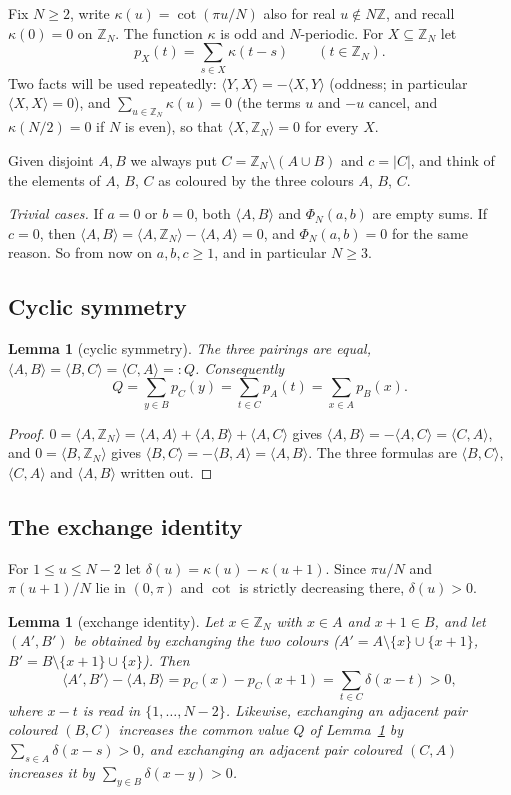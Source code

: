 \documentclass[11pt]{amsart}
\newtheorem{lemma}[theorem]{Lemma}
\theoremstyle{definition}
\theoremstyle{remark}
\newcommand{\Z}{\mathbb{Z}}
\newcommand{\ip}[2]{\langle #1,#2\rangle}
\begin{document}
Fix $N\ge2$, write $\kappa(u)=\cot(\pi u/N)$ also for real $u\notin N\Z$, and recall $\kappa(0)=0$ on $\Z_N$. The
function $\kappa$ is odd and $N$-periodic. For $X\subseteq\Z_N$ let
\[
p_X(t)=\sum_{s\in X}\kappa(t-s)\qquad(t\in\Z_N).
\]
Two facts will be used repeatedly: $\ip YX=-\ip XY$ (oddness; in particular $\ip XX=0$), and
$\sum_{u\in\Z_N}\kappa(u)=0$ (the terms $u$ and $-u$ cancel, and $\kappa(N/2)=0$ if $N$ is even), so that
$\ip X{\Z_N}=0$ for every $X$.

Given disjoint $A,B$ we always put $C=\Z_N\setminus(A\cup B)$ and $c=|C|$, and think of the elements of $A$, $B$,
$C$ as coloured by the three colours $A$, $B$, $C$.

\emph{Trivial cases.} If $a=0$ or $b=0$, both $\ip AB$ and $\Phi_N(a,b)$ are empty sums. If $c=0$, then
$\ip AB=\ip A{\Z_N}-\ip AA=0$, and $\Phi_N(a,b)=0$ for the same reason. So from now on $a,b,c\ge1$, and in
particular $N\ge3$.

\subsection{Cyclic symmetry}

\begin{lemma}[cyclic symmetry]\label{lem:cyclic}
The three pairings are equal, $\ip AB=\ip BC=\ip CA=:Q$. Consequently
\[
Q=\sum_{y\in B}p_C(y)=\sum_{t\in C}p_A(t)=\sum_{x\in A}p_B(x).
\]
\end{lemma}

\begin{proof}
$0=\ip A{\Z_N}=\ip AA+\ip AB+\ip AC$ gives $\ip AB=-\ip AC=\ip CA$, and $0=\ip B{\Z_N}$ gives
$\ip BC=-\ip BA=\ip AB$. The three formulas are $\ip BC$, $\ip CA$ and $\ip AB$ written out.
\end{proof}

\subsection{The exchange identity}
For $1\le u\le N-2$ let $\delta(u)=\kappa(u)-\kappa(u+1)$. Since $\pi u/N$ and $\pi(u+1)/N$ lie in $(0,\pi)$ and
$\cot$ is strictly decreasing there, $\delta(u)>0$.

\begin{lemma}[exchange identity]\label{lem:swap}
Let $x\in\Z_N$ with $x\in A$ and $x+1\in B$, and let $(A',B')$ be obtained by exchanging the two colours
($A'=A\setminus\{x\}\cup\{x+1\}$, $B'=B\setminus\{x+1\}\cup\{x\}$). Then
\[
\ip{A'}{B'}-\ip AB=p_C(x)-p_C(x+1)=\sum_{t\in C}\delta(x-t)>0,
\]
where $x-t$ is read in $\{1,\dots,N-2\}$. Likewise, exchanging an adjacent pair coloured $(B,C)$ increases the
common value $Q$ of Lemma~\ref{lem:cyclic} by $\sum_{s\in A}\delta(x-s)>0$, and exchanging an adjacent pair
coloured $(C,A)$ increases it by $\sum_{y\in B}\delta(x-y)>0$.
\end{lemma}
\end{document}
